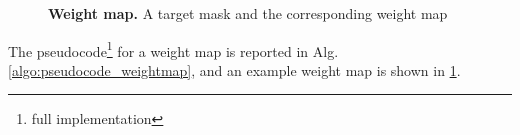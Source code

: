 %
\begin{figure}
    \centering
    \caption{\textbf{Weight map.} A target mask and the corresponding weight map}
    \label{fig:weight_map_example}
\end{figure}
%
The pseudocode\footnote{full implementation \githubweights} for a weight map is reported in Alg. \ref{algo:pseudocode_weightmap}, and an example weight map is shown in \cref{fig:weight_map_example}.

